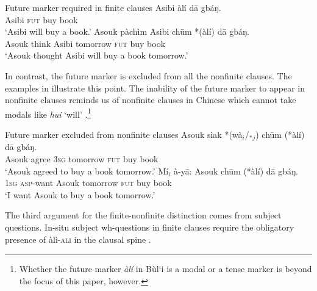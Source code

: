 \documentclass[output=paper,colorlinks,citecolor=brown]{langscibook}
\begin{document}
\ea%
    \label{ex:sulemana:8}
    Future marker required in finite clauses
    \ea%
    \label{ex:sulemana:8a}
    \gll    Asibi àlí dā gbáŋ.\\
            Asibi \textsc{fut} buy book\\
    \glt    `Asibi will buy a book.'
    \ex%
    \label{ex:sulemana:8b}
    \gll    Asouk pàchìm Asibi chūm *(àlí) dā gbáŋ.\\
            Asouk think Asibi tomorrow \textsc{fut}  buy book\\
    \glt    `Asouk thought Asibi will buy a book tomorrow.' 
    \z
\z

In contrast, the future marker is excluded from all the nonfinite clauses. The examples in  illustrate this point. The inability of the future marker to appear in nonfinite clauses reminds us of nonfinite clauses in Chinese which cannot take modals like {\it{hui}} `will' \citep{Huang1998}.\footnote{Whether the future marker {\it{àlí}} in Bùl`i is a modal or a tense marker is beyond the focus of this paper, however.} 

\ea%
    \label{ex:sulemana:9}
    Future marker excluded from nonfinite clauses
    \ea%
    \label{ex:sulemana:9a}
    \gll    Asouk sìak *(wà$_i$/$_*${}$_j$) chūm (*àlí) dā gbáŋ.\\
            Asouk agree \textsc{3sg} tomorrow \textsc{fut} buy book\\
    \glt    `Asouk agreed to buy a book tomorrow.'
    \ex%
    \label{ex:sulemana:9b}
    \gll    Mí$_i$ à-yā: Asouk chūm (*àlí) dā gbáŋ.\\
            \textsc{1sg} \textsc{asp}-want Asouk  tomorrow \textsc{fut}  buy book\\
    \glt    `I want Asouk to buy a book tomorrow.' 
    \z
\z

The third argument for the finite-nonfinite distinction comes from subject questions. In-situ subject wh-questions in finite clauses require the obligatory presence of {àlì-\textsc{ali}} in the clausal spine . 
\end{document}
